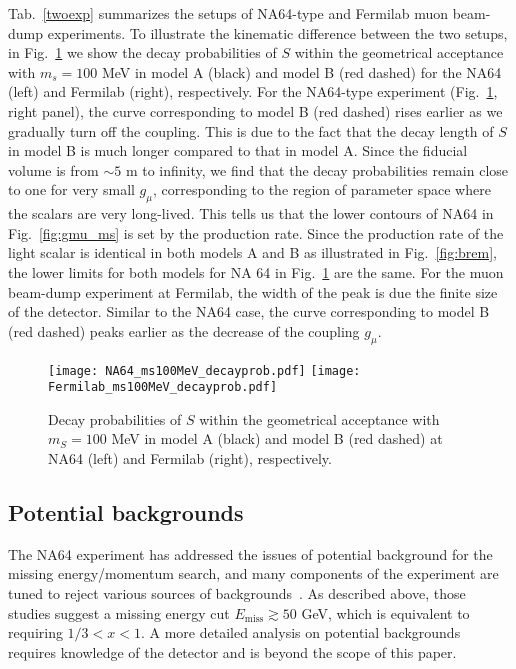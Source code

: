 \documentclass[prd,onecolumn,notitlepage,
nofootinbib,aps,tightenlines,
preprintnumbers,amsmath,amssymb,amsfonts,showpacs,superscriptaddress]{revtex4-1}
\newcommand{\yz}[1]{\textcolor{blue}{\textbf{[YZ: #1]}}}
\begin{document}
Tab.~\ref{twoexp} summarizes the setups of NA64-type and Fermilab muon beam-dump experiments.
To illustrate the kinematic difference between the two setups, in
Fig.~\ref{fig:decyprob} we show the decay probabilities of $S$ within the geometrical acceptance with $m_s=100$ MeV in model A (black) and model B (red dashed) for the  NA64 (left) and Fermilab (right), respectively. For the NA64-type experiment (Fig.~\ref{fig:decyprob}, right panel), the curve corresponding to model B (red dashed) rises earlier as we gradually turn off the coupling. This is due to the fact that the decay length of $S$ in model B is much longer compared to that in model A.  Since the fiducial volume is from $\sim5$ m to infinity, we find that the decay probabilities remain close to one for very small $g_\mu$,  corresponding to the region of parameter space where the scalars are very long-lived. This tells us that the lower contours of NA64 in Fig.~\ref{fig:gmu_ms} is set by the production rate. 
Since the production rate of the light scalar is identical in both models A and B as illustrated in Fig.~\ref{fig:brem}, the lower limits for both models for NA 64 in Fig.~\ref{fig:decyprob} are the same.
For the muon beam-dump experiment at Fermilab, the width of the peak is due the finite size of the detector. Similar to the NA64 case, the curve corresponding to model B (red dashed) peaks earlier as the decrease of the coupling $g_\mu$. 

\begin{figure}[t]
\centering
\texttt{[image: NA64\_ms100MeV\_decayprob.pdf]}
\texttt{[image: Fermilab\_ms100MeV\_decayprob.pdf]}
\caption{\label{fig:decyprob} Decay probabilities of $S$ within the geometrical acceptance with $m_S=100$ MeV in model A (black) and model B (red dashed) at NA64 (left) and Fermilab (right), respectively.}
\end{figure}

\subsection{Potential backgrounds}
The NA64 experiment has addressed the issues of potential background for the missing energy/momentum 
search, and many components of the experiment are tuned to reject various sources of backgrounds~\cite{Gninenko:2014pea, Banerjee:2016tad}. As described above, those studies suggest a missing energy cut $E_\text{miss}\gtrsim 50$ GeV, which is equivalent to requiring $1/3<x<1$. 
A more detailed analysis on potential backgrounds requires knowledge of the detector and is beyond the scope of this paper.
\end{document}
